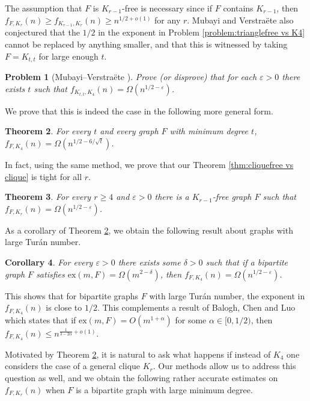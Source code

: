 \documentclass[11pt]{article}
\theoremstyle{plain}
\newtheorem{theorem}{Theorem}[section]
\newtheorem{corollary}[theorem]{Corollary}
\newtheorem{problem}[theorem]{Problem}
\theoremstyle{definition}
\newcommand{\eps}{\varepsilon}
\newcommand{\ex}{\text{ex}}
\begin{document}
The assumption that $F$ is $K_{r-1}$-free is necessary since if $F$ contains $K_{r-1}$, then $f_{F,K_r}(n)\geq f_{K_{r-1},K_r}(n)\geq n^{1/2+o(1)}$ for any $r$. Mubayi and Verstra\"ete also conjectured that the $1/2$ in the exponent in Problem \ref{problem:trianglefree vs K4} cannot be replaced by anything smaller, and that this is witnessed by taking $F=K_{t,t}$ for large enough $t$.

\begin{problem}[Mubayi--Verstra\"ete \cite{MV_general_graphs}] \label{problem:Ktt vs K4}
    Prove (or disprove) that for each $\eps>0$ there exists $t$ such that $f_{K_{t,t},K_4}(n)=\Omega(n^{1/2-\eps})$.
\end{problem}

We prove that this is indeed the case in the following more general form.

\begin{theorem} \label{thm:Ktt vs K4}
    For every $t$ and every graph $F$ with minimum degree $t$, $f_{F,K_4}(n)=\Omega(n^{1/2-6/\sqrt{t}})$.
\end{theorem}

In fact, using the same method, we prove that our Theorem \ref{thm:cliquefree vs clique} is tight for all $r$.

\begin{theorem} \label{thm:F vs Kr}
    For every $r\geq 4$ and $\eps>0$ there is a $K_{r-1}$-free graph $F$ such that $f_{F,K_r}(n)=\Omega(n^{1/2-\eps})$.
\end{theorem}

As a corollary of Theorem \ref{thm:Ktt vs K4}, we obtain the following result about graphs with large Tur\'an number.

\begin{corollary} \label{cor:large Turan}
    For every $\eps>0$ there exists some $\delta>0$ such that if a bipartite graph $F$ satisfies $\ex(m,F)=\Omega(m^{2-\delta})$, then $f_{F,K_4}(n)=\Omega(n^{1/2-\eps})$.
\end{corollary}

This shows that for bipartite graphs $F$ with large Tur\'an number, the exponent in $f_{F,K_4}(n)$ is close to $1/2$. This complements a result of Balogh, Chen and Luo \cite{Balogh_Chen_Luo} which states that if $\ex(m,F)=O(m^{1+\alpha})$ for some $\alpha\in [0,1/2)$, then $f_{F,K_4}(n)\leq n^{\frac{1}{3-2\alpha}+o(1)}$.

Motivated by Theorem \ref{thm:Ktt vs K4}, 
it is natural to ask what happens if instead of $K_4$ one considers the case of a general clique $K_r$. Our methods allow us to address this question as well, and we obtain the following rather accurate estimates on $f_{F,K_r}(n)$ when $F$ is a bipartite graph with large minimum degree.
\end{document}
